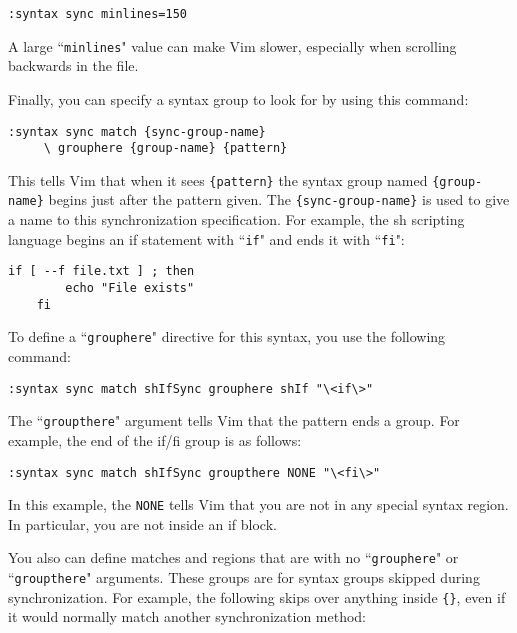 \begin{Verbatim}[samepage=true]
 :syntax sync minlines=150
\end{Verbatim}

A large ``\texttt{minlines}" value can make Vim slower, especially when scrolling backwards in the file.

Finally, you can specify a syntax group to look for by using this command:

\begin{Verbatim}[samepage=true]
 :syntax sync match {sync-group-name}
     \ grouphere {group-name} {pattern}
\end{Verbatim}

This tells Vim that when it sees \texttt{\{pattern\}} the syntax group named \texttt{\{group-name\}} begins just after the pattern given.
The \texttt{\{sync-group-name\}} is used to give a name to this synchronization specification.
For example, the sh scripting language begins an if statement with ``\texttt{if}" and ends it with ``\texttt{fi}":

\begin{Verbatim}[samepage=true]
    if [ --f file.txt ] ; then
        echo "File exists"
    fi
\end{Verbatim}

To define a ``\texttt{grouphere}" directive for this syntax, you use the following command:

\begin{Verbatim}[samepage=true]
 :syntax sync match shIfSync grouphere shIf "\<if\>"
\end{Verbatim}

The ``\texttt{groupthere}" argument tells Vim that the pattern ends a group.
For example, the end of the if/fi group is as follows:

\begin{Verbatim}[samepage=true]
 :syntax sync match shIfSync groupthere NONE "\<fi\>"
\end{Verbatim}

In this example, the \texttt{NONE} tells Vim that you are not in any special syntax region.
In particular, you are not inside an if block.

You also can define matches and regions that are with no ``\texttt{grouphere}" or ``\texttt{groupthere}" arguments.
These groups are for syntax groups skipped during synchronization.
For example, the following skips over anything inside \texttt{\{\}}, even if it would normally match another synchronization method:


